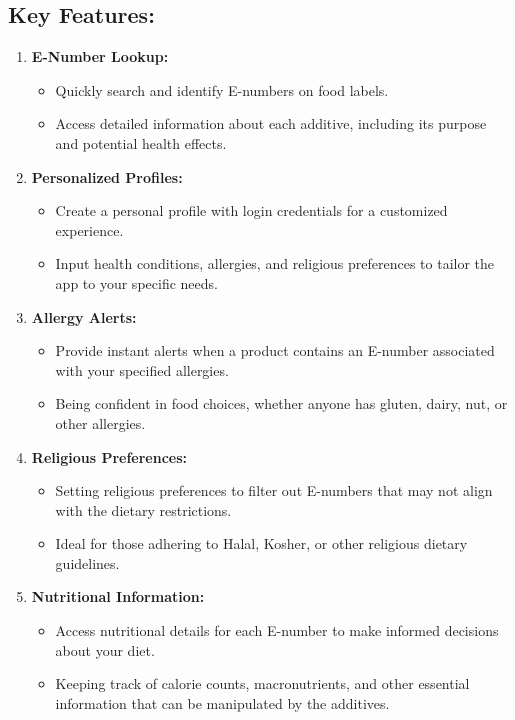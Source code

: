 \documentclass[a4paper,12pt]{report}
\begin{document}
\subsection*{Key Features:}
\begin{enumerate}
	\item {\bfseries E-Number Lookup:}
	      \begin{itemize}
		      \item Quickly search and identify E-numbers on food labels.
		      \item Access detailed information about each additive, including its purpose and potential health effects.
	      \end{itemize}
	\item {\bfseries Personalized Profiles:}
	      \begin{itemize}
		      \item Create a personal profile with login credentials for a customized experience.
		      \item Input health conditions, allergies, and religious preferences to tailor the app to your specific needs.
	      \end{itemize}
	\item {\bfseries Allergy Alerts:}
	      \begin{itemize}
		      \item Provide instant alerts when a product contains an E-number associated with your specified allergies.
		      \item Being confident in food choices, whether anyone has gluten, dairy, nut, or other allergies.
	      \end{itemize}
	\item {\bfseries Religious Preferences:}
	      \begin{itemize}
		      \item Setting religious preferences to filter out E-numbers that may not align with the dietary restrictions.
		      \item Ideal for those adhering to Halal, Kosher, or other religious dietary guidelines.
	      \end{itemize}
	\item {\bfseries Nutritional Information:}
	      \begin{itemize}
		      \item Access nutritional details for each E-number to make informed decisions about your diet.
		      \item Keeping track of calorie counts, macronutrients, and other essential information that can be manipulated by the additives.

\end{itemize}
\end{enumerate}
\end{document}
